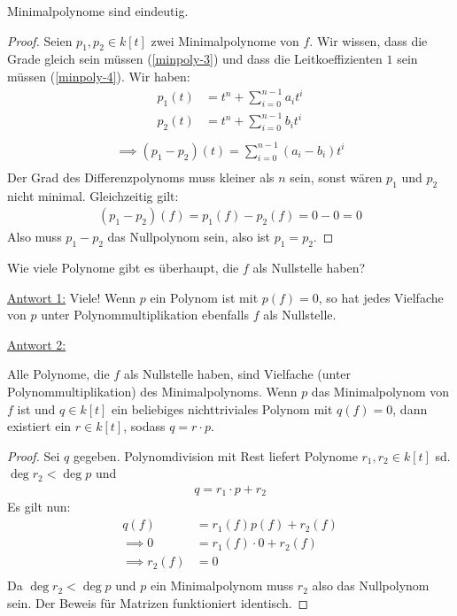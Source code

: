 \documentclass{report}
\newcommand*{\newpar}{\par\vspace{\baselineskip}\noindent}
\newcommand{\ul}[1]{\underline{#1}}
\begin{document}
\begin{theorem}
Minimalpolynome sind eindeutig.
\end{theorem}
\begin{proof}
 Seien $p_1, p_2 \in k[t]$ zwei Minimalpolynome von $f$. Wir wissen, dass die Grade gleich sein müssen (\ref{minpoly-3}) und dass die Leitkoeffizienten $1$ sein müssen (\ref{minpoly-4}). Wir haben:
 \begin{align*}
  p_1(t) &= t^n + \sum^{n-1}_{i=0} a_i t^i\\
  p_2(t) &= t^n + \sum^{n-1}_{i=0} b_i t^i\\
 \end{align*}
 \begin{align*}
  \implies (p_1 - p_2)(t) = \sum^{n-1}_{i=0} (a_i - b_i) t^i\\
 \end{align*}
 Der Grad des Differenzpolynoms muss kleiner als $n$ sein, sonst wären $p_1$ und $p_2$ nicht minimal. Gleichzeitig gilt:
 \begin{align*}
  (p_1 - p_2)(f) = p_1(f) - p_2(f) = 0 - 0 = 0
 \end{align*}
 Also muss $p_1 - p_2$ das Nullpolynom sein, also ist $p_1 = p_2$.
\end{proof}
\begin{question}
 Wie viele Polynome gibt es überhaupt, die $f$ als Nullstelle haben?
\end{question}
\newpar
\ul{Antwort 1:} Viele! Wenn $p$ ein Polynom ist mit $p(f) = 0$, so hat jedes Vielfache von $p$ unter Polynommultiplikation ebenfalls $f$ als Nullstelle.
\newpar
\ul{Antwort 2:}
\begin{theorem}
 Alle Polynome, die $f$ als Nullstelle haben, sind Vielfache (unter Polynommultiplikation) des Minimalpolynoms. Wenn $p$ das Minimalpolynom von $f$ ist und $q \in k[t]$ ein beliebiges nichttriviales Polynom mit $q(f) = 0$, dann existiert ein $r \in k[t]$, sodass $q = r \cdot p$.
\end{theorem}
\begin{proof}
Sei $q$ gegeben. Polynomdivision mit Rest liefert Polynome $r_1, r_2 \in k[t]$ sd. $\deg r_2 < \deg p$ und 
\begin{align*}
 q = r_1 \cdot p + r_2
\end{align*}
Es gilt nun:
\begin{align*}
 q(f) &= r_1(f)p(f) + r_2(f)\\
 \implies 0 &= r_1(f) \cdot 0 + r_2(f)\\
 \implies r_2(f) &= 0\\
\end{align*}
Da $\deg r_2 < \deg p$ und $p$ ein Minimalpolynom muss $r_2$ also das Nullpolynom sein. Der Beweis für Matrizen funktioniert identisch.
\end{proof}
\end{document}

